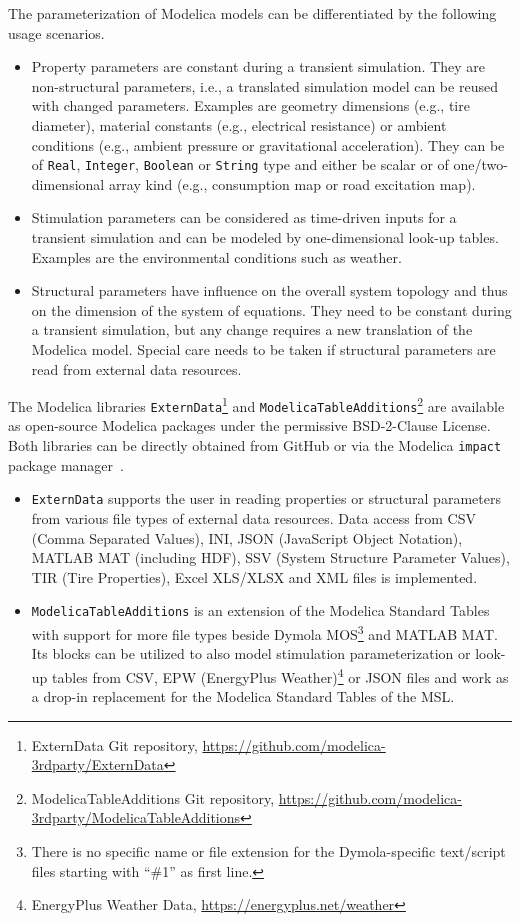 \documentclass{modelica}
\newcommand{\modelica}[1]{\lstinline[language=modelica]|#1|}
\begin{document}
The parameterization of Modelica models can be differentiated by the following usage scenarios.
\begin{itemize}
 \item Property parameters are constant during a transient simulation. They are non-structural parameters, i.e., a translated simulation model can be reused with changed parameters. Examples are geometry dimensions (e.g., tire diameter), material constants (e.g., electrical resistance) or ambient conditions (e.g., ambient pressure or gravitational acceleration). They can be of \modelica{Real}, \modelica{Integer}, \modelica{Boolean} or \modelica{String} type and either be scalar or of one/two-dimensional array kind (e.g., consumption map or road excitation map).
 \item Stimulation parameters can be considered as time-driven inputs for a transient simulation and can be modeled by one-dimensional look-up tables. Examples are the environmental conditions such as weather.
 \item Structural parameters have influence on the overall system topology and thus on the dimension of the system of equations. They need to be constant during a transient simulation, but any change requires a new translation of the Modelica model. Special care needs to be taken if structural parameters are read from external data resources.
\end{itemize}

The Modelica libraries \modelica{ExternData}\footnote{ExternData Git repository, \url{https://github.com/modelica-3rdparty/ExternData}} and \modelica{ModelicaTableAdditions}\footnote{ModelicaTableAdditions Git repository, \url{https://github.com/modelica-3rdparty/ModelicaTableAdditions}} are available as open-source Modelica packages under the permissive BSD-2-Clause License.
Both libraries can be directly obtained from GitHub or via the Modelica \modelica{impact} package manager~\cite{impact, Tiller2015WhereIG}.
\begin{itemize}
 \item \modelica{ExternData} supports the user in reading properties or structural parameters from various file types of external data resources.
 Data access from CSV (Comma Separated Values), INI, JSON (JavaScript Object Notation), MATLAB MAT (including HDF), SSV (System Structure Parameter Values), TIR (Tire Properties), Excel XLS/XLSX and XML files is implemented.
 \item \modelica{ModelicaTableAdditions} is an extension of the Modelica Standard Tables~\cite{modelica2014tables} with support for more file types beside Dymola MOS\footnote{There is no specific name or file extension for the Dymola-specific text/script files starting with ``\#1'' as first line.} and MATLAB MAT.
 Its blocks can be utilized to also model stimulation parameterization or look-up tables from CSV, EPW (EnergyPlus Weather)\footnote{EnergyPlus Weather Data, \url{https://energyplus.net/weather}} or JSON files and work as a drop-in replacement for the Modelica Standard Tables of the MSL.
\end{itemize}
\end{document}
